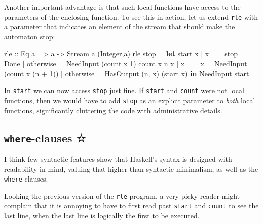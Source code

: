 \documentclass[11pt,
  american,
  DIV13]{article}
\newenvironment{Shaded}{}{}
\newcommand{\DataTypeTok}[1]{\textcolor[rgb]{0.56,0.13,0.00}{#1}}
\newcommand{\DecValTok}[1]{\textcolor[rgb]{0.25,0.63,0.44}{#1}}
\newcommand{\FunctionTok}[1]{\textcolor[rgb]{0.02,0.16,0.49}{#1}}
\newcommand{\KeywordTok}[1]{\textcolor[rgb]{0.00,0.44,0.13}{\textbf{#1}}}
\newcommand{\NormalTok}[1]{#1}
\newcommand{\OperatorTok}[1]{\textcolor[rgb]{0.40,0.40,0.40}{#1}}
\newcommand{\OtherTok}[1]{\textcolor[rgb]{0.00,0.44,0.13}{#1}}
\begin{document}
Another important advantage is that such local functions have access to
the parameters of the enclosing function. To see this in action, let us
extend \texttt{rle} with a parameter that indicates an element of the
stream that should make the automaton stop:

\begin{Shaded}
\begin{Highlighting}[]
\OtherTok{rle ::} \DataTypeTok{Eq}\NormalTok{ a }\OtherTok{=\textgreater{}}\NormalTok{ a }\OtherTok{{-}\textgreater{}} \DataTypeTok{Stream}\NormalTok{ a (}\DataTypeTok{Integer}\NormalTok{,a)}
\NormalTok{rle stop }\OtherTok{=}
  \KeywordTok{let}\NormalTok{ start x }\OperatorTok{|}\NormalTok{ x }\OperatorTok{==}\NormalTok{ stop }\OtherTok{=} \DataTypeTok{Done}
              \OperatorTok{|} \FunctionTok{otherwise} \OtherTok{=} \DataTypeTok{NeedInput}\NormalTok{ (count x }\DecValTok{1}\NormalTok{)}
\NormalTok{      count x n x\textquotesingle{} }\OperatorTok{|}\NormalTok{ x }\OperatorTok{==}\NormalTok{ x\textquotesingle{} }\OtherTok{=} \DataTypeTok{NeedInput}\NormalTok{ (count x (n }\OperatorTok{+} \DecValTok{1}\NormalTok{))}
                   \OperatorTok{|} \FunctionTok{otherwise} \OtherTok{=} \DataTypeTok{HasOutput}\NormalTok{ (n, x) (start x\textquotesingle{})}
  \KeywordTok{in} \DataTypeTok{NeedInput}\NormalTok{ start}
\end{Highlighting}
\end{Shaded}

In \texttt{start} we can now access \texttt{stop} just fine. If
\texttt{start} and \texttt{count} were not local functions, then we
would have to add \texttt{stop} as an explicit parameter to \emph{both}
local functions, significantly cluttering the code with administrative
details.

\hypertarget{where-clauses}{%
\subsection{\texorpdfstring{\texttt{where}-clauses
☆}{where-clauses ☆}}\label{where-clauses}}

I think few syntactic features show that Haskell's syntax is designed
with readability in mind, valuing that higher than syntactic minimalism,
as well as the \texttt{where} clauses.

Looking the previous version of the \texttt{rle} program, a very picky
reader might complain that it is annoying to have to first read past
\texttt{start} and \texttt{count} to see the last line, when the last
line is logically the first to be executed.
\end{document}

